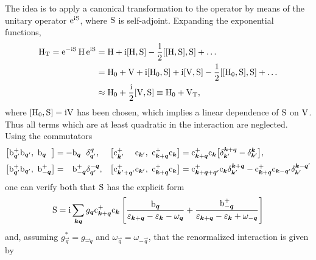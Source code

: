 The idea is to apply a canonical transformation to the  operator
by means of the unitary operator $\mathrm e^{\mathrm i \mathrm S}$, where $\mathrm S$ is self-adjoint.
Expanding the exponential functions,
%
\begin{align*}
    \mathrm H \sb{\text{T}}
    = \mathrm e^{-\mathrm i \mathrm S} \, \mathrm H \, \mathrm e^{\mathrm i \mathrm S}
    &= \mathrm H + \mathrm i [\mathrm H, \mathrm S] - \frac 1 2 [[\mathrm H, \mathrm S], \mathrm S] + \dots \\
    &= \mathrm H_0 + \mathrm V + \mathrm i [\mathrm H_0, \mathrm S] + \mathrm i [\mathrm V, \mathrm S]
    - \frac 1 2 [[\mathrm H_0, \mathrm S], \mathrm S] + \dots \\
    &\approx \mathrm H_0 + \frac {\mathrm i} 2 [\mathrm V, \mathrm S] \equiv \mathrm H_0 + \mathrm V \sb{\text{T}},
\end{align*}
%
where $[\mathrm H_0, \mathrm S] = \mathrm i \mathrm V$ has been chosen, which implies a linear
dependence of $\mathrm S$ on $\mathrm V$. Thus all terms which are at least quadratic in
the interaction are neglected. Using the commutators
%
\begin{align*}
    \big[ \op b_{\vec q'}^+ \op b_{\vec q'}, \ \op b_{\vec q \phantom +} \big]
    &= -\op b_{\vec q \phantom +} \delta_{\vec q'}^{\vec q},
    &
    \big[
        \op c_{\vec k' \phantom{+ \vec q'}}^+ \op c_{\vec k'}, \
        \op c_{\vec k + \vec q}^+ \op c_{\vec k}
    \big]
    &= \op c_{\vec k + \vec q}^+ \op c_{\vec k}
    \big[ \delta_{\vec k'}^{\vec k + \vec q} - \delta_{\vec k'}^{\vec k} \big],
    \\
    \big[ \op b_{\vec q'}^+ \op b_{\vec q'}, \ \op b_{-\vec q}^+ \big]
    &= \phantom + \op b_{-\vec q}^+ \delta_{\vec q'}^{-\vec q},
    &
    \big[
        \op c_{\vec k' + \vec q'}^+ \op c_{\vec k'}, \
        \op c_{\vec k  + \vec q }^+ \op c_{\vec k }
    \big]
    &= \op c_{\vec k + \vec q + \vec q'}^+ \op c_{\vec k}
    \delta_{\vec k'}^{\vec k + \vec q}
    - \op c_{\vec k + \vec q}^+ \op c_{\vec k - \vec q'}
    \delta_{\vec k'}^{\vec k - \vec q'}
\end{align*}
%
one can verify both that $\mathrm S$ has the explicit form
%
\begin{equation*}
    \mathrm S = \mathrm i \sum_{\boldsymbol k \boldsymbol q} g_{\boldsymbol q}
    \mathrm c_{\boldsymbol k + \boldsymbol q}^+ \mathrm c_{\boldsymbol k} \left[
        \frac {\mathrm b_{\boldsymbol q}}
        {\varepsilon_{\boldsymbol k + \boldsymbol q} - \varepsilon_{\boldsymbol k} - \omega_{\boldsymbol q}}
        + \frac {\mathrm b_{-\boldsymbol q}^+}
        {\varepsilon_{\boldsymbol k + \boldsymbol q} - \varepsilon_{\boldsymbol k} + \omega_{-\boldsymbol q}}
    \right]
\end{equation*}
%
and, assuming $g_{\vec q}^* = g_{\vec - q}$ and $\omega_{\vec q} = \omega_{-\vec
q}$, that the renormalized interaction is given by
